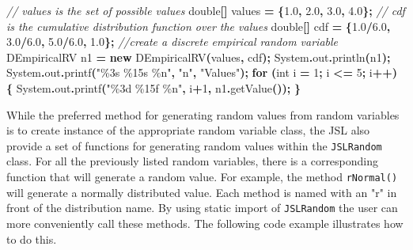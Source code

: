 \documentclass[
]{book}
\newenvironment{Shaded}{\begin{snugshade}}{\end{snugshade}}
\newcommand{\BuiltInTok}[1]{#1}
\newcommand{\CommentTok}[1]{\textcolor[rgb]{0.56,0.35,0.01}{\textit{#1}}}
\newcommand{\ControlFlowTok}[1]{\textcolor[rgb]{0.13,0.29,0.53}{\textbf{#1}}}
\newcommand{\DataTypeTok}[1]{\textcolor[rgb]{0.13,0.29,0.53}{#1}}
\newcommand{\DecValTok}[1]{\textcolor[rgb]{0.00,0.00,0.81}{#1}}
\newcommand{\FloatTok}[1]{\textcolor[rgb]{0.00,0.00,0.81}{#1}}
\newcommand{\FunctionTok}[1]{\textcolor[rgb]{0.00,0.00,0.00}{#1}}
\newcommand{\KeywordTok}[1]{\textcolor[rgb]{0.13,0.29,0.53}{\textbf{#1}}}
\newcommand{\NormalTok}[1]{#1}
\newcommand{\OperatorTok}[1]{\textcolor[rgb]{0.81,0.36,0.00}{\textbf{#1}}}
\newcommand{\SpecialCharTok}[1]{\textcolor[rgb]{0.00,0.00,0.00}{#1}}
\newcommand{\StringTok}[1]{\textcolor[rgb]{0.31,0.60,0.02}{#1}}
\theoremstyle{definition}
\theoremstyle{definition}
\theoremstyle{definition}
\theoremstyle{definition}
\theoremstyle{remark}
\begin{document}
\begin{Shaded}
\begin{Highlighting}[]
\CommentTok{// values is the set of possible values}
\DataTypeTok{double}\OperatorTok{[]}\NormalTok{ values }\OperatorTok{=} \OperatorTok{\{}\FloatTok{1.0}\OperatorTok{,} \FloatTok{2.0}\OperatorTok{,} \FloatTok{3.0}\OperatorTok{,} \FloatTok{4.0}\OperatorTok{\};}
\CommentTok{// cdf is the cumulative distribution function over the values}
\DataTypeTok{double}\OperatorTok{[]}\NormalTok{ cdf }\OperatorTok{=} \OperatorTok{\{}\FloatTok{1.0}\OperatorTok{/}\FloatTok{6.0}\OperatorTok{,} \FloatTok{3.0}\OperatorTok{/}\FloatTok{6.0}\OperatorTok{,} \FloatTok{5.0}\OperatorTok{/}\FloatTok{6.0}\OperatorTok{,} \FloatTok{1.0}\OperatorTok{\};}
\CommentTok{//create a discrete empirical random variable}
\NormalTok{DEmpiricalRV n1 }\OperatorTok{=} \KeywordTok{new} \FunctionTok{DEmpiricalRV}\OperatorTok{(}\NormalTok{values}\OperatorTok{,}\NormalTok{ cdf}\OperatorTok{);}
\BuiltInTok{System}\OperatorTok{.}\FunctionTok{out}\OperatorTok{.}\FunctionTok{println}\OperatorTok{(}\NormalTok{n1}\OperatorTok{);}
\BuiltInTok{System}\OperatorTok{.}\FunctionTok{out}\OperatorTok{.}\FunctionTok{printf}\OperatorTok{(}\StringTok{"}\SpecialCharTok{\%3s}\StringTok{ }\SpecialCharTok{\%15s}\StringTok{ }\SpecialCharTok{\%n}\StringTok{"}\OperatorTok{,} \StringTok{"n"}\OperatorTok{,} \StringTok{"Values"}\OperatorTok{);}
\ControlFlowTok{for} \OperatorTok{(}\DataTypeTok{int}\NormalTok{ i }\OperatorTok{=} \DecValTok{1}\OperatorTok{;}\NormalTok{ i }\OperatorTok{\textless{}=} \DecValTok{5}\OperatorTok{;}\NormalTok{ i}\OperatorTok{++)} \OperatorTok{\{}
    \BuiltInTok{System}\OperatorTok{.}\FunctionTok{out}\OperatorTok{.}\FunctionTok{printf}\OperatorTok{(}\StringTok{"}\SpecialCharTok{\%3d}\StringTok{ }\SpecialCharTok{\%15f}\StringTok{ }\SpecialCharTok{\%n}\StringTok{"}\OperatorTok{,}\NormalTok{ i}\OperatorTok{+}\DecValTok{1}\OperatorTok{,}\NormalTok{ n1}\OperatorTok{.}\FunctionTok{getValue}\OperatorTok{());}
\OperatorTok{\}}
\end{Highlighting}
\end{Shaded}

While the preferred method for generating random values from random
variables is to create instance of the appropriate random variable
class, the JSL also provide a set of functions for generating random
values within the \texttt{JSLRandom} class. For all the previously listed random variables, there is a
corresponding function that will generate a random value. For
example, the method \texttt{rNormal()} will generate a normally distributed
value. Each method is named with an "r" in front of the distribution
name. By using static import of \texttt{JSLRandom} the user can more conveniently call these methods. The following code example illustrates how to do this.
\end{document}
